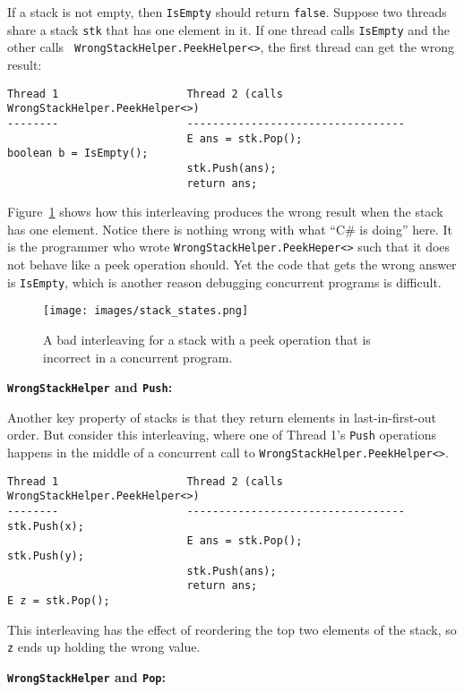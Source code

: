 \documentclass[10pt]{article}
\begin{document}
If a stack is not empty, then {\tt IsEmpty} should return {\tt false}.
Suppose two threads share a stack {\tt stk} that has one element in
it.  If one thread calls {\tt IsEmpty} and the other calls {\tt
  WrongStackHelper.PeekHelper<>}, the first thread can get the wrong result:
\begin{verbatim}
Thread 1                    Thread 2 (calls WrongStackHelper.PeekHelper<>)
--------                    ----------------------------------
                            E ans = stk.Pop();
boolean b = IsEmpty();
                            stk.Push(ans);
                            return ans;
\end{verbatim}
Figure~\ref{fig:stack_states} shows how this interleaving produces the
wrong result when the stack has one element.  Notice there is nothing wrong with what ``C\# is doing'' here.  It is
the programmer who wrote {\tt WrongStackHelper.PeekHeper<>} such that it
does not behave like a peek operation should.  Yet the code that gets the
wrong answer is {\tt IsEmpty}, which is another reason debugging
concurrent programs is difficult.

\begin{figure}
\begin{center}
\texttt{[image: images/stack\_states.png]}
\end{center}
\caption{A bad interleaving for a stack with a peek operation that is
  incorrect in a concurrent program.}
\label{fig:stack_states}
\end{figure}


\medskip
\noindent\textbf{{\tt WrongStackHelper} and {\tt Push}:}
\medskip

Another key property of stacks is that they return elements in
last-in-first-out order.  But consider this interleaving, where one of
Thread 1's {\tt Push} operations happens in the middle of a concurrent
call to {\tt WrongStackHelper.PeekHelper<>}.
\begin{verbatim}
Thread 1                    Thread 2 (calls WrongStackHelper.PeekHelper<>)
--------                    ----------------------------------
stk.Push(x);
                            E ans = stk.Pop();
stk.Push(y);
                            stk.Push(ans);
                            return ans;
E z = stk.Pop();
\end{verbatim}
This interleaving has the effect of reordering the top two elements of
the stack, so {\tt z} ends up holding the wrong value.

\medskip
\noindent\textbf{{\tt WrongStackHelper} and {\tt Pop}:}
\medskip
\end{document}
